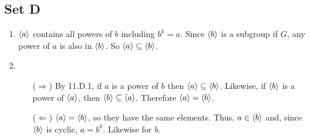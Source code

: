 \subsection{Set D}
\begin{enumerate}
    \item $\langle a\rangle$ contains all powers of $b$ including $b^k = a$. Since $\langle b\rangle$ is a subgroup if $G$, any power of $a$ is also in $\langle b\rangle$. So $\langle a\rangle \subseteq \langle b\rangle$.
    \item
    \begin{enumerate}
        \item [($\Rightarrow$)] By 11.D.1, if $a$ is a power of $b$ then $\langle a\rangle \subseteq \langle b\rangle$. Likewise, if $\langle b\rangle$ is a power of $\langle a\rangle$, then $\langle b\rangle \subseteq \langle a\rangle$. Therefore $\langle a\rangle = \langle b\rangle$.
        \item [($\Leftarrow$)] $\langle a\rangle = \langle b\rangle$, so they have the same elements. Thus, $a \in \langle b\rangle$ and, since $\langle b\rangle$ is cyclic, $a = b^k$. Likewise for $b$.
    \end{enumerate} \end{enumerate}
